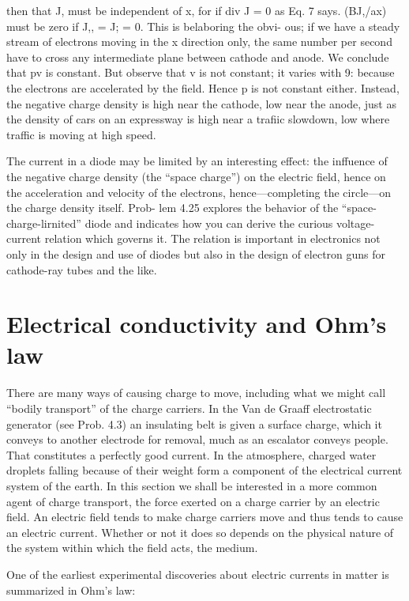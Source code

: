  

then that J, must be independent of x, for if div J = 0 as Eq. 7 says.
(BJ,/ax) must be zero if J,, = J; = 0. This is belaboring the obvi-
ous; if we have a steady stream of electrons moving in the x direction
only, the same number per second have to cross any intermediate
plane between cathode and anode. We conclude that pv is constant.
But observe that v is not constant; it varies with 9: because the electrons
are accelerated by the field. Hence p is not constant either.
Instead, the negative charge density is high near the cathode, low
near the anode, just as the density of cars on an expressway is high
near a trafiic slowdown, low where traffic is moving at high speed.

The current in a diode may be limited by an interesting effect: the
inffuence of the negative charge density (the ``space charge'') on the
electric field, hence on the acceleration and velocity of the electrons,
hence---completing the circle---on the charge density itself. Prob-
lem 4.25 explores the behavior of the ``space-charge-lirnited'' diode
and indicates how you can derive the curious voltage-current relation
which governs it. The relation is important in electronics not only
in the design and use of diodes but also in the design of electron guns
for cathode-ray tubes and the like.

\section{Electrical conductivity and Ohm's law}

There are many ways of causing charge to move, including what
we might call ``bodily transport'' of the charge carriers. In the
Van de Graaff electrostatic generator (see Prob. 4.3) an insulating
belt is given a surface charge, which it conveys to another electrode
for removal, much as an escalator conveys people. That constitutes
a perfectly good current. In the atmosphere, charged water droplets
falling because of their weight form a component of the electrical
current system of the earth. In this section we shall be interested in
a more common agent of charge transport, the force exerted on a
charge carrier by an electric field. An electric field tends to make
charge carriers move and thus tends to cause an electric current.
Whether or not it does so depends on the physical nature of the system
within which the field acts, the medium.

One of the earliest experimental discoveries about electric currents
in matter is summarized in Ohm's law:

